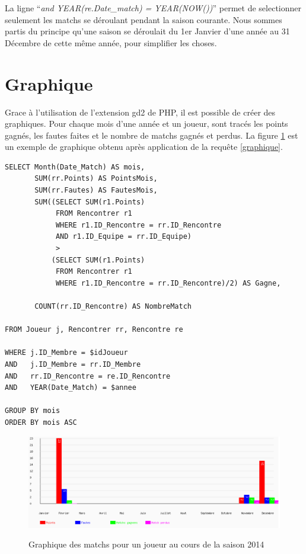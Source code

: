 \documentclass[a4paper»,8pt,french,fleqn]{report}
\begin{document}
La ligne ``\textit{and YEAR(re.Date\_match) = YEAR(NOW())}'' permet de selectionner seulement les matchs se déroulant pendant la saison courante. Nous sommes partis du principe qu'une saison se déroulait du 1er Janvier d'une année au 31 Décembre de cette même année, pour simplifier les choses.


\section{Graphique}
Grace à l'utilisation de l'extension gd2 de PHP, il est possible de créer des graphiques. Pour chaque mois d'une année et un joueur, sont tracés les points gagnés, les fautes faites et le nombre de matchs gagnés et perdus. La figure \ref{fig:graph} est un exemple de graphique obtenu après application de la requête \ref{graphique}.

\begin{lstlisting}
SELECT Month(Date_Match) AS mois,
       SUM(rr.Points) AS PointsMois,
       SUM(rr.Fautes) AS FautesMois,
       SUM((SELECT SUM(r1.Points)
            FROM Rencontrer r1
            WHERE r1.ID_Rencontre = rr.ID_Rencontre
            AND r1.ID_Equipe = rr.ID_Equipe)
            >
           (SELECT SUM(r1.Points)
            FROM Rencontrer r1
            WHERE r1.ID_Rencontre = rr.ID_Rencontre)/2) AS Gagne,
    
       COUNT(rr.ID_Rencontre) AS NombreMatch

FROM Joueur j, Rencontrer rr, Rencontre re

WHERE j.ID_Membre = $idJoueur
AND   j.ID_Membre = rr.ID_Membre
AND   rr.ID_Rencontre = re.ID_Rencontre
AND   YEAR(Date_Match) = $annee

GROUP BY mois 
ORDER BY mois ASC
\end{lstlisting}

\begin{figure}[h]
  \centering
    \includegraphics[scale=0.5]{graphe.png}
    \label{fig:graph}
    \caption{Graphique des matchs pour un joueur au cours de la saison 2014}
\end{figure}
\end{document}
